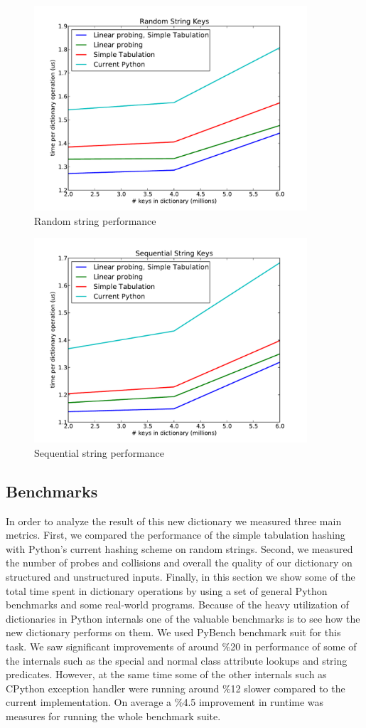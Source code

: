 \documentclass[11pt]{article}
\begin{document}
 \begin{figure}[H]
   \centering
   \includegraphics[width=4in]{randstring.pdf}
   \caption{Random string performance}
   \label{fig:randstring}
 \end{figure}
 \begin{figure}[H]
   \centering
   \includegraphics[width=4in]{seqstring.pdf}
   \caption{Sequential string performance}
   \label{fig:seqstring}
 \end{figure}

\subsection{Benchmarks}
In order to analyze the result of this new dictionary we measured three main metrics. First, we compared the performance of the simple tabulation hashing with Python’s current hashing scheme on random strings. Second, we measured the number of probes and collisions and overall the quality of our dictionary on structured and unstructured inputs. Finally, in this section  we show some of the total time spent in dictionary operations by using a set of general Python benchmarks and some real-world programs.
Because of the heavy utilization of dictionaries in Python internals one of the valuable benchmarks is to see how the new dictionary performs on them. We used PyBench benchmark suit for this task. We saw significant improvements of around \%20 in performance of some of the internals such as the special and normal class attribute lookups and string predicates. However, at the same time some of the other internals such as CPython exception handler were running around \%12 slower compared to the current implementation. On average a \%4.5 improvement in runtime was measures for running the whole benchmark suite.
\end{document}
